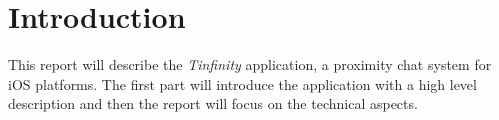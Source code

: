 \section{Introduction}
This report will describe the \emph{Tinfinity} application, a proximity chat system for iOS platforms. The first part will introduce the application with a high level description and then the report will focus on the technical aspects.